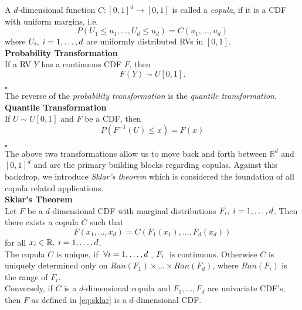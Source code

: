 
A $d$-dimensional function $C: [0,1]^d \rightarrow [0,1]$ is called a \textit{copula}, if it is a \ac{CDF} with uniform margins, i.e.
\begin{equation*}
P\left(U_{1} \leq u_{1}, \ldots, U_{d} \leq u_{d}\right)=C\left(u_{1}, \ldots, u_{d}\right)
\end{equation*}
where 
$ U_{i}, \hspace{0.25em} i = 1, \ldots, d $ 
are uniformly distributed \acp{RV} in $[0,1]$.\\

\textbf{Probability Transformation}\\
If a \ac{RV} $Y$ has a continuous \ac{CDF} $F$, then
\begin{equation}
F(Y) \sim U[0,1].
\label{eq:probability_transformation}
\end{equation}

\hfill $\square$ \\

The reverse of the \textit{probability transformation} is the \textit{quantile transformation}.\\

\textbf{Quantile Transformation}\\
If $U \sim U[0,1]$ and $F$ be a \ac{CDF}, then
\begin{equation}
P\left(F^{-1}(U) \leq x\right)=F(x)
\label{eq:quantile_transformation}
\end{equation}

\hfill $\square$ \\

The above two transformations allow us to move back and forth between $\mathbb{R}^d$ and $[0,1]^d$ and are the primary building blocks regarding copulas. Against this backdrop, we introduce \textit{Sklar's theorem} which is considered the foundation of all copula related applications.\\




\textbf{Sklar's Theorem} \cite{sklar1959fonctions} \\
Let $F$ be a $d$-dimensional \ac{CDF} with marginal distributions $F_{i}, \hspace{0.25em} i = 1, \ldots, d$.
Then there exists a copula $C$ such that
\begin{equation}
F(x_1, \ldots, x_d) = C (F_1(x_1), \ldots, F_d(x_d))
\label{eq:sklar}
\end{equation}
for all $x_i \in \mathbb{R}, \hspace{0.25em} i = 1, \ldots, d $.\\
The copula $C$ is unique, if $ \hspace{0.25em} \forall i = 1, \ldots, d \hspace{0.25em}$,  $F_i \hspace{0.25em}$  is continuous. Otherwise $C$ is uniquely determined only on
$Ran(F_1) \times \ldots \times Ran(F_d)$, where $Ran(F_{i})$ is the range of $F_i$.\\
Conversely, if $C$ is a $d$-dimensional copula and $F_1, \ldots, F_d$ are univariate \ac{CDF}'s, then $F$ as defined in \autoref{eq:sklar} is a 
$d$-dimensional \ac{CDF}.

